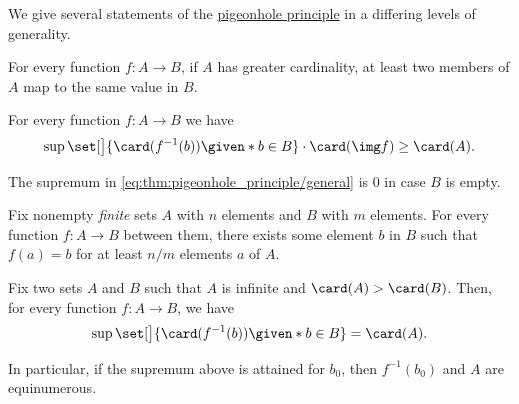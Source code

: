 \begin{theorem}\label{thm:pigeonhole_principle}
  We give several statements of the \hyperref[con:pigeonhole_principle]{pigeonhole principle} in a differing levels of generality.

  \begin{thmenum}
     For every function \( f: A \to B \), if \( A \) has greater cardinality, at least two members of \( A \) map to the same value in \( B \).

     For every function \( f: A \to B \) we have
    \begin{equation}\label{eq:thm:pigeonhole_principle/general}
      \sup\set[\big]{ \card(f^{-1}(b)) \given* b \in B } \cdot \card(\img f) \geq \card(A).
    \end{equation}

    The supremum in \eqref{eq:thm:pigeonhole_principle/general} is \( 0 \) in case \( B \) is empty.

     Fix nonempty \emph{finite} sets \( A \) with \( n \) elements and \( B \) with \( m \) elements. For every function \( f: A \to B \) between them, there exists some element \( b \) in \( B \) such that \( f(a) = b \) for at least \( n / m \) elements \( a \) of \( A \).

     Fix two sets \( A \) and \( B \) such that \( A \) is infinite and \( \card(A) > \card(B) \). Then, for every function \( f: A \to B \), we have
    \begin{equation}\label{eq:thm:pigeonhole_principle/infinitary}
      \sup\set[\big]{ \card(f^{-1}(b)) \given* b \in B } = \card(A).
    \end{equation}

    In particular, if the supremum above is attained for \( b_0 \), then \( f^{-1}(b_0) \) and \( A \) are equinumerous.
  \end{thmenum}
\end{theorem}
